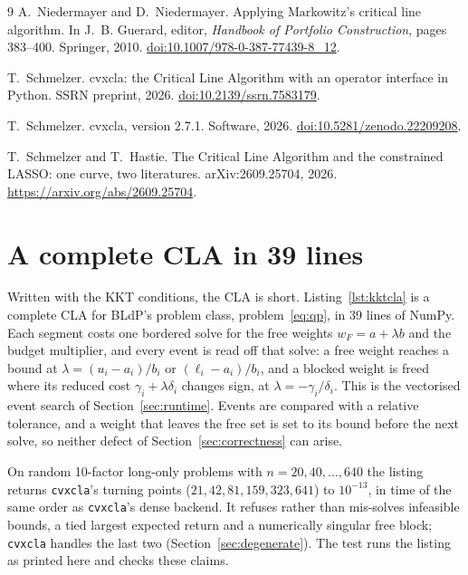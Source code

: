 \documentclass[11pt,a4paper]{article}
\newcommand{\code}[1]{\texttt{#1}}
\newcommand{\cvxcla}{\code{cvxcla}}
\newcommand{\repo}{https://github.com/cvxgrp/cvxcla/blob/main}
\newcommand{\repofile}[1]{\href{\repo/#1}{\code{\detokenize{#1}}}}
\begin{document}
\begin{thebibliography}{9}
A.~Niedermayer and D.~Niedermayer.
\newblock Applying Markowitz's critical line algorithm.
\newblock In J.~B. Guerard, editor, \emph{Handbook of Portfolio
  Construction}, pages 383--400. Springer, 2010.
\newblock \href{https://doi.org/10.1007/978-0-387-77439-8_12}{doi:10.1007/978-0-387-77439-8\_12}.

T.~Schmelzer.
\newblock cvxcla: the Critical Line Algorithm with an operator interface in
  Python.
\newblock SSRN preprint, 2026.
\newblock \href{https://doi.org/10.2139/ssrn.7583179}{doi:10.2139/ssrn.7583179}.

T.~Schmelzer.
\newblock cvxcla, version 2.7.1.
\newblock Software, 2026.
\newblock \href{https://doi.org/10.5281/zenodo.22209208}{doi:10.5281/zenodo.22209208}.

T.~Schmelzer and T.~Hastie.
\newblock The Critical Line Algorithm and the constrained LASSO: one curve,
  two literatures.
\newblock arXiv:2609.25704, 2026.
\newblock \url{https://arxiv.org/abs/2609.25704}.

\end{thebibliography}
\endgroup

\appendix

\section{A complete CLA in 39 lines}\label{app:kktcla}

Written with the KKT conditions, the CLA is short. Listing~\ref{lst:kktcla} is
a complete CLA for BLdP's problem class, problem~\eqref{eq:qp}, in 39 lines of
NumPy. Each segment costs one bordered solve for the free weights
$w_F = a + \lambda b$ and the budget multiplier, and every event is read off
that solve: a free weight reaches a bound at $\lambda = (u_i - a_i)/b_i$ or
$(\ell_i - a_i)/b_i$, and a blocked weight is freed where its reduced cost
$\gamma_i + \lambda\delta_i$ changes sign, at $\lambda = -\gamma_i/\delta_i$.
This is the vectorised event search of Section~\ref{sec:runtime}. Events are
compared with a relative tolerance, and a weight that leaves the free set is
set to its bound before the next solve, so neither defect of
Section~\ref{sec:correctness} can arise.

On random 10-factor long-only problems with $n = 20, 40, \dots, 640$ the
listing returns \cvxcla{}'s turning points
($21, 42, 81, 159, 323, 641$) to $10^{-13}$, in time of the same order as
\cvxcla{}'s dense backend. It refuses rather than mis-solves infeasible
bounds, a tied largest expected return and a numerically singular free block;
\cvxcla{} handles the last two (Section~\ref{sec:degenerate}). The test
\repofile{tests/test_comparison_listing.py} runs the listing as printed here
and checks these claims.
\end{document}
